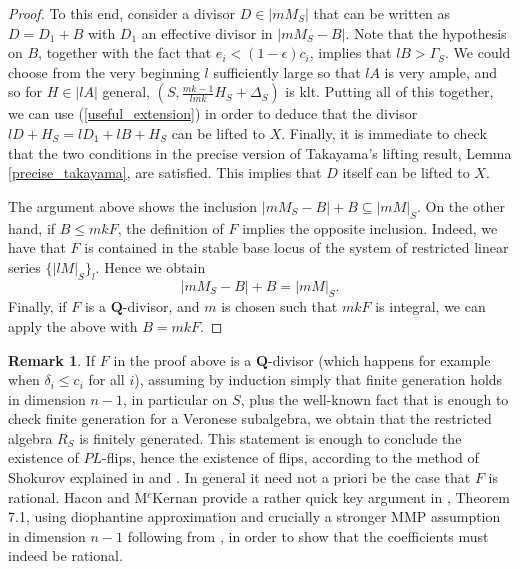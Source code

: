 \documentclass[11pt]{amsart}
\theoremstyle{plain}
\theoremstyle{definition}
\newtheorem{remark}[theorem]{Remark}
\newcommand{\QQ}{\mathbf{Q}}
\begin{document}
\begin{proof}
To this end, consider a divisor $D \in |mM_S|$ that can be written 
as  $D = D_1 + B$ with $D_1$ an effective divisor in $|mM_S - B|$. Note that the hypothesis 
on $B$, together with the fact that $e_i < (1-\epsilon) c_i$, implies that $lB > \Gamma_S$. We  could 
choose from the very beginning $l$ sufficiently large so that $l A$  is very ample, and so for $H \in |l A|$ general, $(S,  \frac{mk-1}{lmk} H_S + \Delta_S)$ is klt. 
Putting all of this together, we can use (\ref{useful_extension}) in order to deduce that the divisor $lD + H_S = l D_1 + lB + H_S$ can be lifted to $X$. Finally, it is immediate to check that the two conditions
in the precise version of Takayama's lifting result, 
Lemma \ref{precise_takayama}, are satisfied. This implies that $D$ itself can be lifted to $X$. 

The argument above shows the inclusion $|mM_S - B| + B \subseteq  |mM|_S$.
On the other hand, if $B \le mkF$, the definition of $F$ implies the opposite inclusion. Indeed,  
we have that $F$ is contained in the stable base locus of the system of restricted linear series 
$\{|lM|_S\}_l$. Hence we obtain 
$$|mM_S - B| + B =  |mM|_S.$$
Finally, if $F$ is a $\QQ$-divisor, and $m$ is chosen such that  $mkF$ is integral, we can apply the above with $B = mkF$.
\end{proof}


\begin{remark}
If $F$ in the proof above is a $\QQ$-divisor (which happens for example when $\delta_i \le c_i$ for all $i$), assuming by induction simply that finite generation holds in dimension $n-1$, in particular on $S$, plus the well-known fact that is enough to check finite generation for a Veronese subalgebra, we obtain that the restricted algebra $R_S$ is finitely generated. This statement is enough to conclude  the existence of $PL$-flips,  hence the existence of flips, according to the method of Shokurov explained in \cite{hm2} and \cite{hm3}. In general it need not a priori be the case that $F$ is rational. Hacon and 
M$^c$Kernan provide a rather quick key argument in \cite{hm3}, Theorem 7.1, using diophantine approximation and crucially a stronger MMP assumption in dimension $n-1$ following from \cite{bchm}, in order to show that the coefficients must indeed be rational.
\end{remark}
\end{document}
